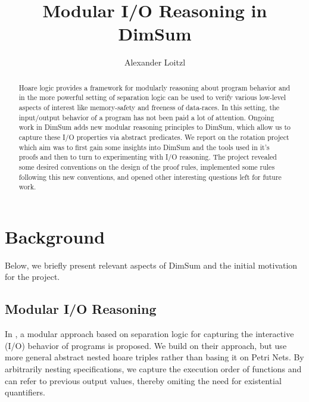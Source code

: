 \documentclass[runningheads, orivec]{llncs}
\begin{document}
\title{Modular I/O Reasoning in DimSum}
%
%
\author{Alexander Loitzl\Envelope{}}%
%

%
\maketitle              %
%
%

\begin{abstract}
  Hoare logic provides a framework for modularly reasoning about program behavior and in the more powerful setting of separation logic can be used to verify various low-level aspects of interest like memory-safety and freeness of data-races. In this setting, the input/output behavior of a program has not been paid a lot of attention. Ongoing work in DimSum adds new modular reasoning principles to DimSum, which allow us to capture these I/O properties via abstract predicates.
  We report on the rotation project which aim was to first gain some insights into DimSum and the tools used in it's proofs and then to turn to experimenting with I/O reasoning. The project revealed some desired conventions on the design of the proof rules, implemented some rules following this new conventions, and opened other interesting questions left for future work.
\end{abstract}

\section{Background}
Below, we briefly present relevant aspects of DimSum\cite{dimsum} and the initial motivation for the project.
\subsection{Modular I/O Reasoning}

In \cite{io1,io2},  a modular approach based on separation logic for capturing the interactive (I/O) behavior of programs is proposed. We build on their approach, but use more general abstract nested hoare triples rather than basing it on Petri Nets. By arbitrarily nesting specifications, we capture the execution order of functions and can refer to previous output values, thereby omiting the need for existential quantifiers.
\end{document}
